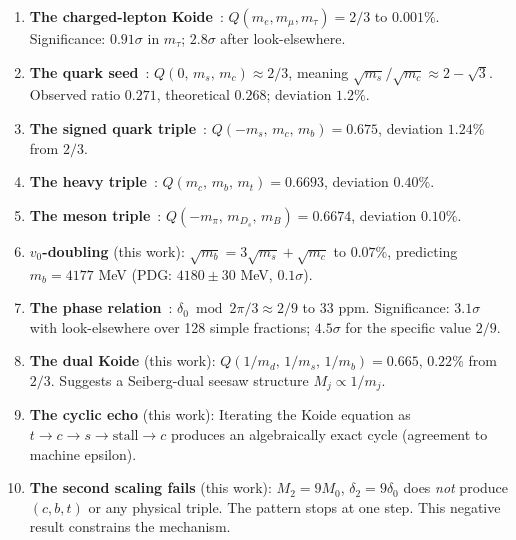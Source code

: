 \documentclass[12pt,a4paper]{article}
\begin{document}
\begin{enumerate}
\item \textbf{The charged-lepton Koide}~\cite{Koide1983}:
   $Q(m_e,m_\mu,m_\tau) = 2/3$ to $0.001\%$.  Significance: $0.91\sigma$ in $m_\tau$;
   $2.8\sigma$ after look-elsewhere.

\item \textbf{The quark seed}~\cite{Rivero2012}:
   $Q(0,\,m_s,\,m_c) \approx 2/3$, meaning $\sqrt{m_s}/\sqrt{m_c} \approx 2-\sqrt{3}$.
   Observed ratio $0.271$, theoretical $0.268$; deviation $1.2\%$.

\item \textbf{The signed quark triple}~\cite{Rivero2012}:
   $Q(-m_s,\,m_c,\,m_b) = 0.675$, deviation $1.24\%$ from $2/3$.

\item \textbf{The heavy triple}~\cite{RodejohannZhang2011}:
   $Q(m_c,\,m_b,\,m_t) = 0.6693$, deviation $0.40\%$.

\item \textbf{The meson triple}~\cite{Rivero2007}:
   $Q(-m_\pi,\,m_{D_s},\,m_B) = 0.6674$, deviation $0.10\%$.

\item \textbf{$v_0$-doubling} (this work):
   $\sqrt{m_b} = 3\sqrt{m_s} + \sqrt{m_c}$ to $0.07\%$, predicting $m_b = 4177$ MeV
   (PDG: $4180 \pm 30$ MeV, $0.1\sigma$).

\item \textbf{The phase relation}~\cite{Zenczykowski2012}:
   $\delta_0 \bmod 2\pi/3 \approx 2/9$ to 33 ppm.  Significance: $3.1\sigma$ with
   look-elsewhere over 128 simple fractions; $4.5\sigma$ for the specific value $2/9$.

\item \textbf{The dual Koide} (this work):
   $Q(1/m_d,\,1/m_s,\,1/m_b) = 0.665$, $0.22\%$ from $2/3$.
   Suggests a Seiberg-dual seesaw structure $M_j \propto 1/m_j$.

\item \textbf{The cyclic echo} (this work):
   Iterating the Koide equation as $t \to c \to s \to \text{stall} \to c$ produces an
   algebraically exact cycle (agreement to machine epsilon).

\item \textbf{The second scaling fails} (this work):
    $M_2 = 9M_0$, $\delta_2 = 9\delta_0$ does \emph{not} produce $(c,b,t)$ or any physical
    triple.  The pattern stops at one step.  This negative result constrains the
    mechanism.
\end{enumerate}
\end{document}
